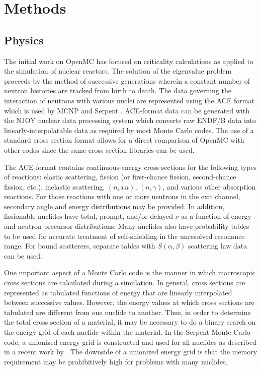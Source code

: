 \documentclass[authoryear,preprint]{elsarticle}
\begin{document}
\section{Methods}

\subsection{Physics}

The initial work on OpenMC has focused on criticality calculations as applied to
the simulation of nuclear reactors. The solution of the eigenvalue problem
proceeds by the method of successive generations \citep{lieberoth} wherein a
constant number of neutron histories are tracked from birth to death. The data
governing the interaction of neutrons with various nuclei are represented using
the ACE format \citep{ace-format} which is used by MCNP \citep{mcnp} and Serpent
\citep{serpent}. ACE-format data can be generated with the NJOY nuclear data
processing system which converts raw ENDF/B data into linearly-interpolatable data
as required by most Monte Carlo codes. The use of a standard cross section
format allows for a direct comparison of OpenMC with other codes since the same
cross section libraries can be used.

The ACE-format contains continuous-energy cross sections for the following types
of reactions: elastic scattering, fission (or first-chance fission,
second-chance fission, etc.), inelastic scattering, $(n,xn)$, $(n,\gamma)$, and
various other absorption reactions. For those reactions with one or more
neutrons in the exit channel, secondary angle and energy distributions may be
provided. In addition, fissionable nuclides have total, prompt, and/or delayed
$\nu$ as a function of energy and neutron precursor distributions. Many nuclides
also have probability tables to be used for accurate treatment of self-shielding
in the unresolved resonance range. For bound scatterers, separate tables with
$S(\alpha,\beta)$ scattering law data can be used.

One important aspect of a Monte Carlo code is the manner in which macroscopic
cross sections are calculated during a simulation. In general, cross sections
are represented as tabulated functions of energy that are linearly interpolated
between successive values. However, the energy values at which cross sections
are tabulated are different from one nuclide to another. Thus, in order to
determine the total cross section of a material, it may be necessary to do a
binary search on the energy grid of each nuclide within the material. In the
Serpent Monte Carlo code, a unionized energy grid is constructed and used for
all nuclides as described in a recent work by \citet{uniongrid}. The downside of
a unionized energy grid is that the memory requirement may be prohibitively high
for problems with many nuclides.
\end{document}
